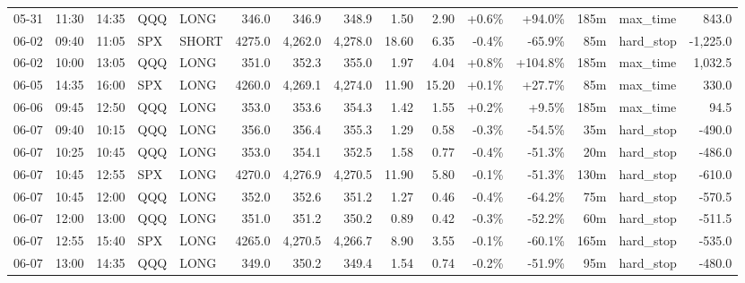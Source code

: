 \documentclass[11pt,a4paper,twoside]{article}
\begin{document}
\begin{landscape}
\begin{center}
\begin{longtable}{>{\color{txtmain}}l l l l l r r r r r r r r >{\color{txtmain}}l r}
05-31 & 11:30 & 14:35 & QQQ & LONG & 346.0 & 346.9 & 348.9 & 1.50 & 2.90 & \textcolor{wingreen}{+0.6\%} & \textcolor{wingreen}{+94.0\%} & 185m & max\_time & \textcolor{wingreen}{843.0} \\
06-02 & 09:40 & 11:05 & SPX & SHORT & 4275.0 & 4,262.0 & 4,278.0 & 18.60 & 6.35 & \textcolor{lossred}{-0.4\%} & \textcolor{lossred}{-65.9\%} & 85m & hard\_stop & \textcolor{lossred}{-1,225.0} \\
06-02 & 10:00 & 13:05 & QQQ & LONG & 351.0 & 352.3 & 355.0 & 1.97 & 4.04 & \textcolor{wingreen}{+0.8\%} & \textcolor{wingreen}{+104.8\%} & 185m & max\_time & \textcolor{wingreen}{1,032.5} \\
06-05 & 14:35 & 16:00 & SPX & LONG & 4260.0 & 4,269.1 & 4,274.0 & 11.90 & 15.20 & \textcolor{wingreen}{+0.1\%} & \textcolor{wingreen}{+27.7\%} & 85m & max\_time & \textcolor{wingreen}{330.0} \\
06-06 & 09:45 & 12:50 & QQQ & LONG & 353.0 & 353.6 & 354.3 & 1.42 & 1.55 & \textcolor{wingreen}{+0.2\%} & \textcolor{wingreen}{+9.5\%} & 185m & max\_time & \textcolor{wingreen}{94.5} \\
06-07 & 09:40 & 10:15 & QQQ & LONG & 356.0 & 356.4 & 355.3 & 1.29 & 0.58 & \textcolor{lossred}{-0.3\%} & \textcolor{lossred}{-54.5\%} & 35m & hard\_stop & \textcolor{lossred}{-490.0} \\
06-07 & 10:25 & 10:45 & QQQ & LONG & 353.0 & 354.1 & 352.5 & 1.58 & 0.77 & \textcolor{lossred}{-0.4\%} & \textcolor{lossred}{-51.3\%} & 20m & hard\_stop & \textcolor{lossred}{-486.0} \\
06-07 & 10:45 & 12:55 & SPX & LONG & 4270.0 & 4,276.9 & 4,270.5 & 11.90 & 5.80 & \textcolor{lossred}{-0.1\%} & \textcolor{lossred}{-51.3\%} & 130m & hard\_stop & \textcolor{lossred}{-610.0} \\
06-07 & 10:45 & 12:00 & QQQ & LONG & 352.0 & 352.6 & 351.2 & 1.27 & 0.46 & \textcolor{lossred}{-0.4\%} & \textcolor{lossred}{-64.2\%} & 75m & hard\_stop & \textcolor{lossred}{-570.5} \\
06-07 & 12:00 & 13:00 & QQQ & LONG & 351.0 & 351.2 & 350.2 & 0.89 & 0.42 & \textcolor{lossred}{-0.3\%} & \textcolor{lossred}{-52.2\%} & 60m & hard\_stop & \textcolor{lossred}{-511.5} \\
06-07 & 12:55 & 15:40 & SPX & LONG & 4265.0 & 4,270.5 & 4,266.7 & 8.90 & 3.55 & \textcolor{lossred}{-0.1\%} & \textcolor{lossred}{-60.1\%} & 165m & hard\_stop & \textcolor{lossred}{-535.0} \\
06-07 & 13:00 & 14:35 & QQQ & LONG & 349.0 & 350.2 & 349.4 & 1.54 & 0.74 & \textcolor{lossred}{-0.2\%} & \textcolor{lossred}{-51.9\%} & 95m & hard\_stop & \textcolor{lossred}{-480.0} \\

\end{longtable}
\end{center}
\end{landscape}
\end{document}
